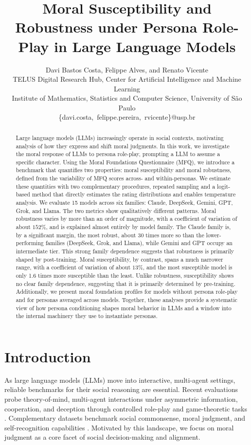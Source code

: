 \documentclass{article}
\title{Moral Susceptibility and Robustness under Persona Role-Play in Large Language Models}
\author{
Davi Bastos Costa, Felippe Alves, and Renato Vicente \\
TELUS Digital Research Hub, Center for Artificial Intelligence and Machine Learning \\
Institute of Mathematics, Statistics and Computer Science, University of S\~ao Paulo\\
\{davi.costa,\ felippe.pereira,\ rvicente\}@usp.br
}
\begin{document}
\ifcolmsubmission
\linenumbers
\fi


\maketitle

\begin{abstract}
  Large language models (LLMs) increasingly operate in social contexts, motivating analysis of how they express and shift moral judgments. In this work, we investigate the moral response of LLMs to persona role-play, prompting a LLM to assume a specific character. Using the Moral Foundations Questionnaire (MFQ), we introduce a benchmark that quantifies two properties: moral susceptibility and moral robustness, defined from the variability of MFQ scores across- and within-personas. We estimate these quantities with two complementary procedures, repeated sampling and a logit-based method that directly estimates the rating distributions and enables temperature analysis. We evaluate 15 models across six families: Claude, DeepSeek, Gemini, GPT, Grok, and Llama. The two metrics show qualitatively different patterns. Moral robustness varies by more than an order of magnitude, with a coefficient of variation of about $152\%$, and is explained almost entirely by model family. The Claude family is, by a significant margin, the most robust, about 30 times more so than the lower-performing families (DeepSeek, Grok, and Llama), while Gemini and GPT occupy an intermediate tier. This strong family dependence suggests that robustness is primarily shaped by post-training. Moral susceptibility, by contrast, spans a much narrower range, with a coefficient of variation of about $13\%$, and the most susceptible model is only 1.6 times more susceptible than the least. Unlike robustness, susceptibility shows no clear family dependence, suggesting that it is primarily determined by pre-training.  Additionally, we present moral foundation profiles for models without persona role-play and for personas averaged across models. Together, these analyses provide a systematic view of how persona conditioning shapes moral behavior in LLMs and a window into the internal machinery they use to instantiate personas.
\end{abstract}


\section{Introduction}
As large language models (LLMs) move into interactive, multi-agent settings, reliable benchmarks for their social reasoning are essential. Recent evaluations probe theory-of-mind, multi-agent interactions under asymmetric information, cooperation, and deception through controlled role-play and game-theoretic tasks \cite{zhou2024sotopia,pan2023machiavelli,bianchi2024negotiationarena,chen-etal-2024-tombench,costa2025deceivedetectdiscloselarge}. Complementary datasets benchmark social commonsense, moral judgment, and self-recognition capabilities \cite{sap-etal-2019-social,hendrycks2021ethics,bai2025knowthyselfincapabilityimplications}. Motivated by this landscape, we focus on moral judgment as a core facet of social decision-making and alignment.
\end{document}
